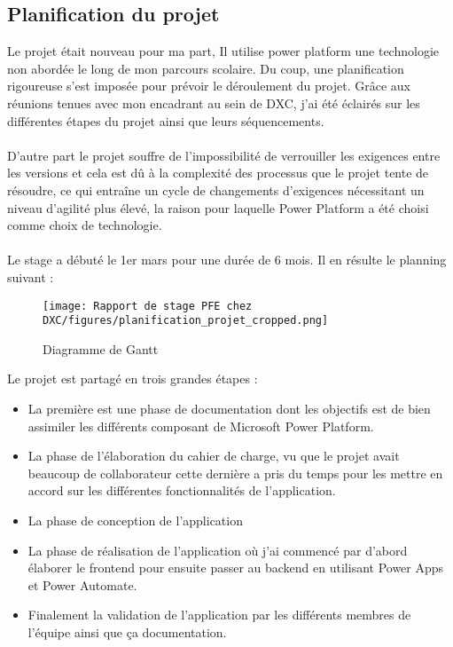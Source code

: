 \subsection{Planification du projet}

Le projet était nouveau pour ma part, Il utilise power platform une technologie non abordée le long de mon parcours scolaire. Du coup, une planification rigoureuse s’est imposée pour prévoir le déroulement du projet. Grâce aux réunions tenues avec mon encadrant au sein de DXC, j'ai été éclairés sur les différentes étapes du projet ainsi que leurs séquencements.
\\ \\
D'autre part le projet souffre de l'impossibilité de verrouiller les exigences entre les versions et cela est dû à la complexité des processus que le projet tente de résoudre, ce qui entraîne un cycle de changements d'exigences nécessitant un niveau d'agilité plus élevé, la raison pour laquelle Power Platform a été choisi comme choix de technologie.
\\\\
Le stage a débuté le 1er mars pour une durée de 6 mois. Il en résulte le planning
suivant :
\\
\begin{figure}[!h]
    \centering
    \texttt{[image: Rapport de stage PFE chez DXC/figures/planification\_projet\_cropped.png]}
    \caption{Diagramme de Gantt}
\end{figure}

Le projet est partagé en trois grandes étapes : 
\\
\begin{itemize}
  \item La première est une phase de documentation dont les objectifs est de bien assimiler les différents composant de Microsoft Power Platform.
  \item La phase de l'élaboration du cahier de charge, vu que le projet avait beaucoup de collaborateur cette dernière a pris du temps pour les mettre en accord sur les différentes fonctionnalités de l'application.
  \item La phase de conception de l'application
  \item La phase de réalisation de l'application où j'ai commencé par d'abord élaborer le frontend pour ensuite passer au backend en utilisant Power Apps et Power Automate.
  \item Finalement la validation de l'application par les différents membres de l'équipe ainsi que ça documentation.
\end{itemize}
\\

